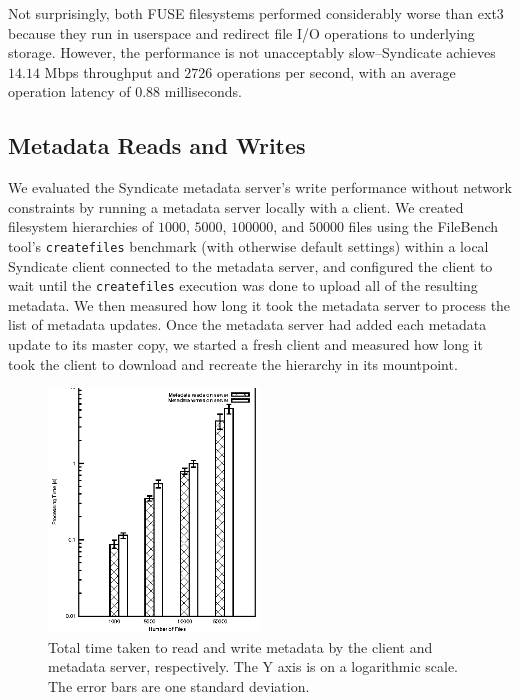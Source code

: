 Not surprisingly, both FUSE filesystems performed considerably worse than ext3 because
they run in userspace and redirect file I/O operations to underlying storage.
However, the performance is not unacceptably slow--Syndicate achieves $14.14$ Mbps 
throughput and $2726$ operations per second, with an average operation latency of $0.88$ milliseconds.

\subsection{Metadata Reads and Writes}

We evaluated the Syndicate metadata server's write performance without network constraints
by running a metadata server locally with a client.  We created filesystem hierarchies of 
$1000$, $5000$, $100000$, and $50000$ files using the FileBench tool's \texttt{createfiles} 
benchmark (with otherwise default settings) within a local Syndicate client connected to the
metadata server, and configured the client to wait until the \texttt{createfiles} execution 
was done to upload all of the resulting metadata.  We then measured how long it took the metadata
server to process the list of metadata updates.  Once the metadata server had added
each metadata update to its master copy, we started a fresh client and measured how long it
took the client to download and recreate the hierarchy in its mountpoint.

\begin{figure}[h!]
\centering
\includegraphics[width=0.5\textwidth]{data/metadata/metadata}
\caption{Total time taken to read and write metadata by the client and metadata server,
respectively.  The Y axis is on a logarithmic scale.  The error bars are one standard
deviation.}
\label{fig:metadata-io}
\end{figure}

